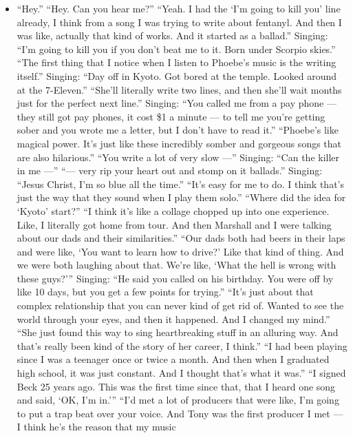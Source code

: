 \begin{itemize}
\tightlist
\item
  ``Hey.'' ``Hey. Can you hear me?'' ``Yeah. I had the `I'm going to
  kill you' line already, I think from a song I was trying to write
  about fentanyl. And then I was like, actually that kind of works. And
  it started as a ballad.'' Singing: ``I'm going to kill you if you
  don't beat me to it. Born under Scorpio skies.'' ``The first thing
  that I notice when I listen to Phoebe's music is the writing itself.''
  Singing: ``Day off in Kyoto. Got bored at the temple. Looked around at
  the 7-Eleven.'' ``She'll literally write two lines, and then she'll
  wait months just for the perfect next line.'' Singing: ``You called me
  from a pay phone --- they still got pay phones, it cost \$1 a minute
  --- to tell me you're getting sober and you wrote me a letter, but I
  don't have to read it.'' ``Phoebe's like magical power. It's just like
  these incredibly somber and gorgeous songs that are also hilarious.''
  ``You write a lot of very slow ---'' Singing: ``Can the killer in me
  ---'' ``--- very rip your heart out and stomp on it ballads.''
  Singing: ``Jesus Christ, I'm so blue all the time.'' ``It's easy for
  me to do. I think that's just the way that they sound when I play them
  solo.'' ``Where did the idea for `Kyoto' start?'' ``I think it's like
  a collage chopped up into one experience. Like, I literally got home
  from tour. And then Marshall and I were talking about our dads and
  their similarities.'' ``Our dads both had beers in their laps and were
  like, `You want to learn how to drive?' Like that kind of thing. And
  we were both laughing about that. We're like, `What the hell is wrong
  with these guys?''' Singing: ``He said you called on his birthday. You
  were off by like 10 days, but you get a few points for trying.''
  ``It's just about that complex relationship that you can never kind of
  get rid of. Wanted to see the world through your eyes, and then it
  happened. And I changed my mind.'' ``She just found this way to sing
  heartbreaking stuff in an alluring way. And that's really been kind of
  the story of her career, I think.'' ``I had been playing since I was a
  teenager once or twice a month. And then when I graduated high school,
  it was just constant. And I thought that's what it was.'' ``I signed
  Beck 25 years ago. This was the first time since that, that I heard
  one song and said, `OK, I'm in.''' ``I'd met a lot of producers that
  were like, I'm going to put a trap beat over your voice. And Tony was
  the first producer I met --- I think he's the reason that my music

\end{itemize}
